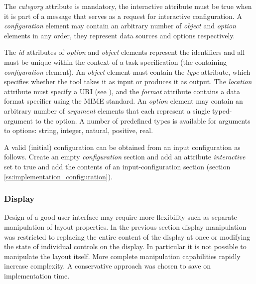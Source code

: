 \documentclass{article}
\begin{document}
   \noindent The \textit{category} attribute is mandatory, the interactive
   attribute must be true when it is part of a message that serves as a request
   for interactive configuration.  A \textit{configuration} element may contain
   an arbitrary number of \textit{object} and \textit{option} elements in any
   order, they represent data sources and options respectively.
   
   The \textit{id} attributes of \textit{option} and \textit{object} elements
   represent the identifiers and all must be unique within the context of a
   task specification (the containing \textit{configuration} element).  An
   \textit{object} element must contain the \textit{type} attribute, which
   specifies whether the tool takes it as input or produces it as output. The
   \textit{location} attribute must specify a URI (see \cite{rfc3305}), and the
   \textit{format} attribute contains a data format specifier using the MIME
   standard.  An \textit{option} element may contain an arbitrary number of
   \textit{argument} elements that each represent a single typed-argument to
   the option. A number of predefined types is available for arguments to
   options: string, integer, natural, positive, real.

   A valid (initial) configuration can be obtained from an input configuration
   as follows.  Create an empty \textit{configuration} section and add an
   attribute \textit{interactive} set to true and add the contents of an
   input-configuration section (section \ref{ss:implementation_configuration}).

  \subsubsection{Display}

   Design of a good user interface may require more flexibility such as
   separate manipulation of layout properties. In the previous section display
   manipulation was restricted to replacing the entire content of the display
   at once or modifying the state of individual controls on the display.  In
   particular it is not possible to manipulate the layout itself. More complete
   manipulation capabilities rapidly increase complexity. A conservative
   approach was chosen to save on implementation time. 

\end{document}
